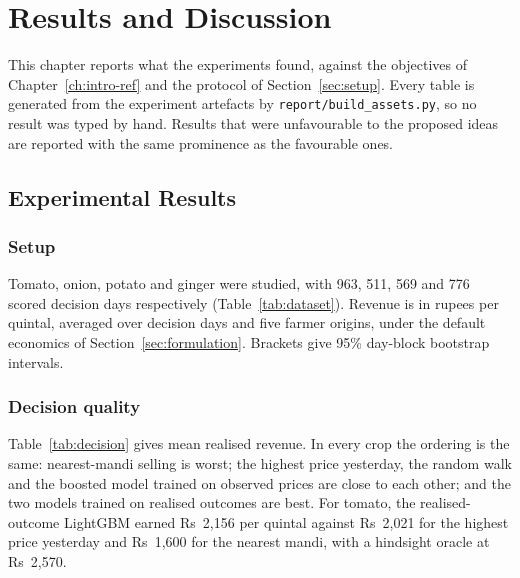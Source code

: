 \chapter{Results and Discussion}
\label{ch:results}

This chapter reports what the experiments found, against the objectives of Chapter~\ref{ch:intro-ref} and the protocol of Section~\ref{sec:setup}. Every table is generated from the experiment artefacts by \texttt{report/build\_assets.py}, so no result was typed by hand. Results that were unfavourable to the proposed ideas are reported with the same prominence as the favourable ones.

\section{Experimental Results}
\label{sec:experimental-results}

\subsection{Setup}
Tomato, onion, potato and ginger were studied, with 963, 511, 569 and 776 scored decision days respectively (Table~\ref{tab:dataset}). Revenue is in rupees per quintal, averaged over decision days and five farmer origins, under the default economics of Section~\ref{sec:formulation}. Brackets give 95\% day-block bootstrap intervals.

\subsection{Decision quality}

Table~\ref{tab:decision} gives mean realised revenue. In every crop the ordering is the same: nearest-mandi selling is worst; the highest price yesterday, the random walk and the boosted model trained on observed prices are close to each other; and the two models trained on realised outcomes are best. For tomato, the realised-outcome LightGBM earned Rs~2,156 per quintal against Rs~2,021 for the highest price yesterday and Rs~1,600 for the nearest mandi, with a hindsight oracle at Rs~2,570.

\begin{table}[!b]
\centering
\caption{Mean realised net revenue (Rs per quintal) with 95\% intervals; oracle shown without interval}
\label{tab:decision}
\end{table}

\begin{table}[!t]
\centering
\caption{Share of the nearest-mandi-to-oracle gap closed, and share of recommendations sent to a silent market}
\label{tab:gap}
\end{table}

